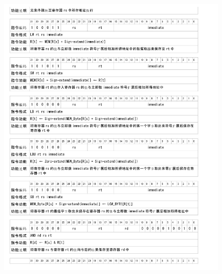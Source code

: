     \begin{figure}[!hbp]
            \centering
            \includegraphics[width=\textwidth]{chart/insert4.jpg}
    \end{figure}

